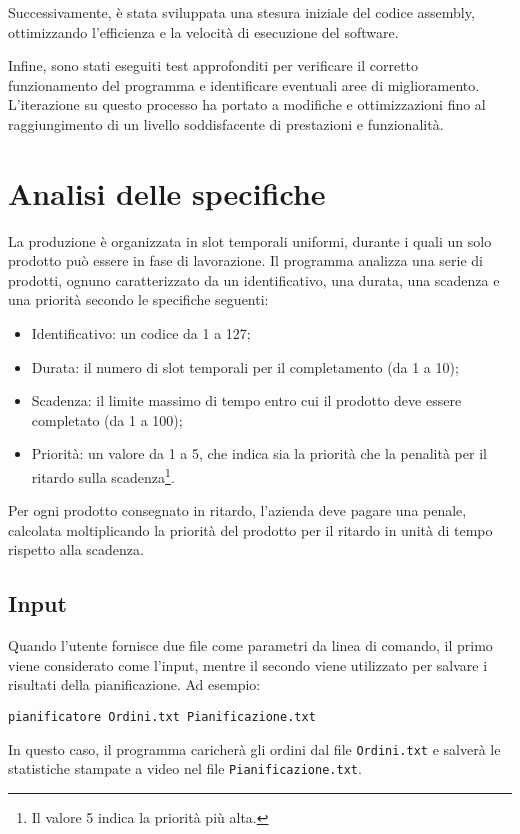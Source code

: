 \documentclass[a4paper]{report}
\begin{document}
Successivamente, è stata sviluppata una stesura iniziale del codice assembly,
ottimizzando l'efficienza e la velocità di esecuzione del software.

Infine, sono stati eseguiti test approfonditi per verificare il corretto
funzionamento del programma e identificare eventuali aree di miglioramento.
L'iterazione su questo processo ha portato a modifiche e ottimizzazioni
fino al raggiungimento di un livello soddisfacente di prestazioni e funzionalità.

\section{Analisi delle specifiche}
La produzione è organizzata in slot temporali uniformi, durante i quali un solo prodotto può essere in fase di lavorazione.
Il programma analizza una serie di prodotti, ognuno caratterizzato da un identificativo, una durata, una scadenza e una priorità secondo le specifiche seguenti:
\begin{itemize}
    \item Identificativo: un codice da 1 a 127;
    \item Durata: il numero di slot temporali per il completamento (da 1 a 10);
    \item Scadenza: il limite massimo di tempo entro cui il prodotto deve essere completato (da 1 a 100);
    \item Priorità: un valore da 1 a 5, che indica sia la priorità che la penalità per il ritardo sulla scadenza\footnote{Il valore 5 indica la priorità più alta.}.
\end{itemize}
Per ogni prodotto consegnato in ritardo, l'azienda deve pagare una penale, calcolata moltiplicando la priorità del prodotto per il ritardo in unità di tempo rispetto alla scadenza.

\subsection{Input}
Quando l'utente fornisce due file come parametri da linea di comando, il primo viene considerato come l'input, mentre il secondo viene utilizzato per salvare i risultati della pianificazione. Ad esempio:

\begin{verbatim}
pianificatore Ordini.txt Pianificazione.txt
\end{verbatim}

In questo caso, il programma caricherà gli ordini dal file \texttt{Ordini.txt} e salverà le statistiche stampate a video nel file \texttt{Pianificazione.txt}.
\end{document}
